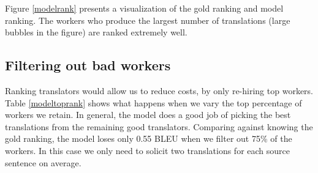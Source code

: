 \documentclass[11pt,letterpaper]{article}
\begin{document}
Figure \ref{modelrank} presents a visualization of the gold ranking and model ranking. The workers who produce the largest number of translations (large bubbles in the figure) are ranked extremely well.


\subsection{Filtering out bad workers}

Ranking translators would allow us to reduce costs, by only re-hiring top workers.
 Table \ref{modeltoprank} shows what happens when we vary the top percentage of workers we retain.  In general, the model does a good job of picking the best translations from the remaining good translators.  Comparing against knowing the gold ranking, the model loses only 0.55 BLEU when we filter out 75\% of the workers.  In this case we only need to solicit two translations for each source sentence on average.
\end{document}
